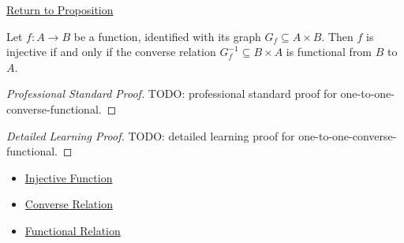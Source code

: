 \newpage
{}
\label{prf:one-to-one-converse-functional}

\begin{remark*}[Return]
\hyperref[prop:one-to-one-converse-functional]{Return to Proposition}
\end{remark*}

\begin{proposition*}
Let $f:A\to B$ be a function, identified with its graph
$G_f\subseteq A\times B$. Then $f$ is injective if and only if the converse
relation $G_f^{-1}\subseteq B\times A$ is functional from $B$ to $A$.
\end{proposition*}

\begin{proof}[Professional Standard Proof]
\LRAProofBodyStart
TODO: professional standard proof for one-to-one-converse-functional.
\end{proof}

\begin{proof}[Detailed Learning Proof]
\LRAProofBodyStart
TODO: detailed learning proof for one-to-one-converse-functional.
\end{proof}

\begin{remark*}

\end{remark*}

\begin{dependencies}
\begin{itemize}
  \item \hyperref[def:injective]{Injective Function}
  \item \hyperref[def:converse-relation]{Converse Relation}
  \item \hyperref[def:functional-relation]{Functional Relation}
\end{itemize}
\end{dependencies}

\clearpage
